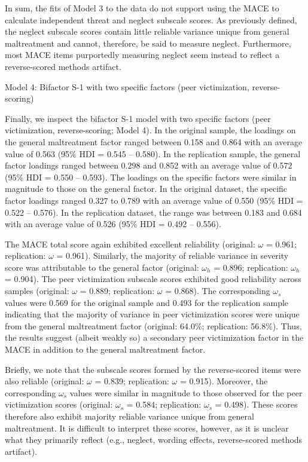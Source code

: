 \documentclass[letterpaper,man,natbib,longtable,floatsintext,12pt]{apa6}
\makeatletter
\renewcommand{\subsubsection}{\@startsection{subsubsection}{3}
  {\z@}%
  {\b@level@two@skip}{\e@level@two@skip}%
  {\normalfont\normalsize\bfseries}}
\makeatother
\begin{document}
In sum, the fits of Model 3 to the data do not support using the MACE to calculate independent threat and neglect subscale scores. As previously defined, the neglect subscale scores contain little reliable variance unique from general maltreatment and cannot, therefore, be said to measure neglect. Furthermore, most MACE items purportedly measuring neglect seem instead to reflect a reverse-scored methods artifact.

\subsubsection{Model 4: Bifactor S-1 with two specific factors (peer victimization, reverse- scoring)}

Finally, we inspect the bifactor S-1 model with two specific factors (peer victimization, reverse-scoring; Model 4). In the original sample, the loadings on the general maltreatment factor ranged between 0.158 and 0.864 with an average value of 0.563 (95\% HDI = 0.545 -- 0.580). In the replication sample, the general factor loadings ranged between 0.298 and 0.852 with an average value of 0.572 (95\% HDI = 0.550 -- 0.593). The loadings on the specific factors were similar in magnitude to those on the general factor. In the original dataset, the specific factor loadings ranged 0.327 to 0.789 with an average value of 0.550 (95\% HDI = 0.522 -- 0.576). In the replication dataset, the range was between 0.183 and 0.684 with an average value of 0.526 (95\% HDI = 0.492 -- 0.556). 

The MACE total score again exhibited excellent reliability (original: $\omega$ = 0.961; replication: $\omega$ = 0.961). Similarly, the majority of reliable variance in severity score was attributable to the general factor (original: $\omega_h$ = 0.896; replication: $\omega_h$ = 0.904). The peer victimization subscale scores exhibited good reliability across samples (original: $\omega$ = 0.889; replication: $\omega$ = 0.868). The corresponding $\omega_s$ values were 0.569 for the original sample and 0.493 for the replication sample indicating that the majority of variance in peer victimization scores were unique from the general maltreatment factor (original: 64.0\%; replication: 56.8\%). Thus, the results suggest (albeit weakly so) a secondary peer victimization factor in the MACE in addition to the general maltreatment factor. 

Briefly, we note that the subscale scores formed by the reverse-scored items were also reliable (original: $\omega$ = 0.839; replication: $\omega$ = 0.915). Moreover, the corresponding $\omega_s$ values were similar in magnitude to those observed for the peer victimization scores (original: $\omega_s$ = 0.584; replication: $\omega_s$ = 0.498). These scores therefore also exhibit majority reliable variance unique from general maltreatment. It is difficult to interpret these scores, however, as it is unclear what they primarily reflect (e.g., neglect, wording effects, reverse-scored methods artifact). 
\end{document}
